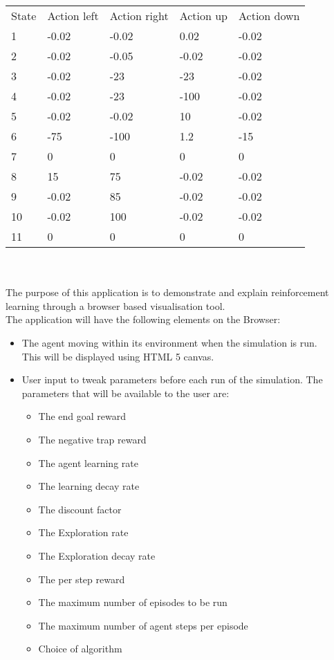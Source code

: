 \begin{tabular}{lllll}
	State & Action left & Action right & Action up & Action down \\
	1     & -0.02           & -0.02              & 0.02     & -0.02           \\
	2     & -0.02           & -0.05            & -0.02         & -0.02           \\
	3     & -0.02           & -23            & -23         & -0.02           \\
	4     & -0.02           & -23            & -100        & -0.02           \\
	5     &  -0.02        & -0.02           & 10       & -0.02       \\
	6     & -75           & -100            & 1.2         & -15           \\
	7     & 0           & 0            & 0         & 0          \\
	8     & 15           & 75            & -0.02         & -0.02           \\
	9     & -0.02          & 85           & -0.02        &-0.02         \\
	10    &  -0.02            & 100            &  -0.02          &  -0.02  \\ 
	11    & 0           & 0            & 0         & 0         
\end{tabular}
\\
\\
The purpose of this application is to demonstrate and explain reinforcement learning through a browser based visualisation tool.\\
The application will have the following elements on the Browser:
\begin{itemize}
\item The agent moving within its environment when the simulation is run.\\This will be displayed using HTML 5 canvas.

\item User input to tweak parameters before each run of the simulation. The parameters that will be available to the user are:
	\begin{itemize}
		\item The end goal reward
		\item The negative trap reward
		\item The agent learning rate
		\item The learning decay rate
		\item The discount factor
		\item The Exploration rate
		\item The Exploration decay rate
		\item The per step reward
		\item The maximum number of episodes to be run
		\item The maximum number of agent steps per episode
		\item Choice of algorithm
	\end{itemize}
\end{itemize}

